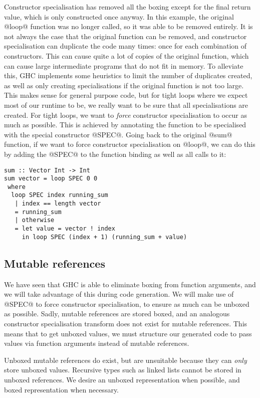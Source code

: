 Constructor specialisation has removed all the boxing except for the final return value, which is only constructed once anyway.
In this example, the original @loop@ function was no longer called, so it was able to be removed entirely.
It is not always the case that the original function can be removed, and constructor specialisation can duplicate the code many times: once for each combination of constructors.
This can cause quite a lot of copies of the original function, which can cause large intermediate programs that do not fit in memory.
To alleviate this, GHC implements some heuristics to limit the number of duplicates created, as well as only creating specialisations if the original function is not too large.
This makes sense for general purpose code, but for tight loops where we expect most of our runtime to be, we really want to be sure that all specialisations are created.
For tight loops, we want to \emph{force} constructor specialisation to occur as much as possible.
This is achieved by annotating the function to be specialised with the special constructor @SPEC@.
Going back to the original @sum@ function, if we want to force constructor specialisation on @loop@, we can do this by adding the @SPEC@ to the function binding as well as all calls to it:

\begin{lstlisting}
sum :: Vector Int -> Int
sum vector = loop SPEC 0 0
 where
  loop SPEC index running_sum
   | index == length vector
   = running_sum
   | otherwise
   = let value = vector ! index
     in loop SPEC (index + 1) (running_sum + value)
\end{lstlisting}

\subsection{Mutable references}
\label{ss:extraction:mutablerefs}

We have seen that GHC is able to eliminate boxing from function arguments, and we will take advantage of this during code generation.
We will make use of @SPEC@ to force constructor specialisation, to ensure as much can be unboxed as possible.
Sadly, mutable references are stored boxed, and an analogous constructor specialisation transform does not exist for mutable references.
This means that to get unboxed values, we must structure our generated code to pass values via function arguments instead of mutable references.

Unboxed mutable references do exist, but are unsuitable because they can \emph{only} store unboxed values.
Recursive types such as linked lists cannot be stored in unboxed references.
We desire an unboxed representation when possible, and boxed representation when necessary.

